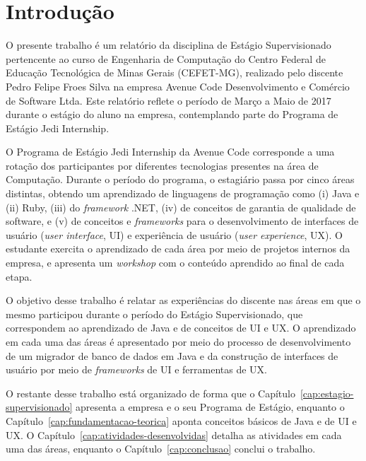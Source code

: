 \chapter{Introdução}
\label{cap:introducao}

O presente trabalho é um relatório da disciplina de Estágio Supervisionado pertencente ao curso de Engenharia de Computação do Centro Federal de Educação Tecnológica de Minas Gerais (CEFET-MG), realizado pelo discente Pedro Felipe Froes Silva na empresa Avenue Code Desenvolvimento e Comércio de Software Ltda. Este relatório reflete o período de Março a Maio de 2017 durante o estágio do aluno na empresa, contemplando parte do Programa de Estágio Jedi Internship.

O Programa de Estágio Jedi Internship da Avenue Code corresponde a uma rotação dos participantes por diferentes tecnologias presentes na área de Computação. Durante o período do programa, o estagiário passa por cinco áreas distintas, obtendo um aprendizado de linguagens de programação como (i) Java e (ii) Ruby, (iii) do \textit{framework} .NET, (iv) de conceitos de garantia de qualidade de software, e (v) de conceitos e \textit{frameworks} para o desenvolvimento de interfaces de usuário (\textit{user interface}, UI) e experiência de usuário (\textit{user experience}, UX). O estudante exercita o aprendizado de cada área por meio de projetos internos da empresa, e apresenta um \textit{workshop} com o conteúdo aprendido ao final de cada etapa.

O objetivo desse trabalho é relatar as experiências do discente nas áreas em que o mesmo participou durante o período do Estágio Supervisionado, que correspondem ao aprendizado de Java e de conceitos de UI e UX. O aprendizado em cada uma das áreas é apresentado por meio do processo de desenvolvimento de um migrador de banco de dados em Java e da construção de interfaces de usuário por meio de \textit{frameworks} de UI e ferramentas de UX.

O restante desse trabalho está organizado de forma que o Capítulo~\ref{cap:estagio-supervisionado} apresenta a empresa e o seu Programa de Estágio, enquanto o Capítulo~\ref{cap:fundamentacao-teorica} aponta conceitos básicos de Java e de UI e UX. O Capítulo~\ref{cap:atividades-desenvolvidas} detalha as atividades em cada uma das áreas, enquanto o Capítulo~\ref{cap:conclusao} conclui o trabalho.
